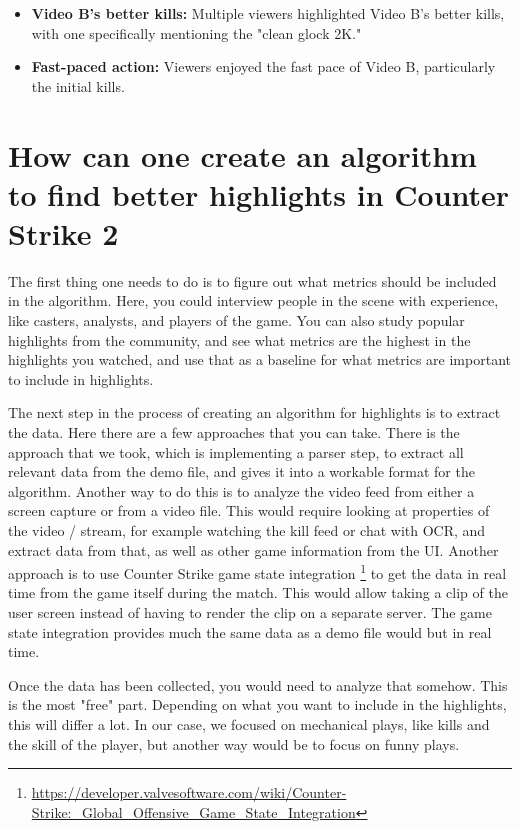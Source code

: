 \begin{itemize}
\item \textbf{Video B's better kills:} Multiple viewers highlighted Video B's better kills, with one specifically mentioning the "clean glock 2K."
\item \textbf{Fast-paced action:} Viewers enjoyed the fast pace of Video B, particularly the initial kills.
\end{itemize}



\section{How can one create an algorithm to find better highlights in Counter Strike 2}
The first thing one needs to do is to figure out what metrics should be included in the algorithm. Here, you could interview people in the scene with experience, like casters, analysts, and players of the game. You can also study popular highlights from the community, and see what metrics are the highest in the highlights you watched, and use that as a baseline for what metrics are important to include in highlights. 

The next step in the process of creating an algorithm for highlights is to extract the data. Here there are a few approaches that you can take. There is the approach that we took, which is implementing a parser step, to extract all relevant data from the demo file, and gives it into a workable format for the algorithm. Another way to do this is to analyze the video feed from either a screen capture or from a video file. This would require looking at properties of the video / stream, for example watching the kill feed or chat with OCR, and extract data from that, as well as other game information from the UI. Another approach is to use Counter Strike game state integration \footnote{\url{https://developer.valvesoftware.com/wiki/Counter-Strike:_Global_Offensive_Game_State_Integration}} to get the data in real time from the game itself during the match. This would allow taking a clip of the user screen instead of having to render the clip on a separate server. The game state integration provides much the same data as a demo file would but in real time.

Once the data has been collected, you would need to analyze that somehow. This is the most "free" part. Depending on what you want to include in the highlights, this will differ a lot. In our case, we focused on mechanical plays, like kills and the skill of the player, but another way would be to focus on funny plays.

